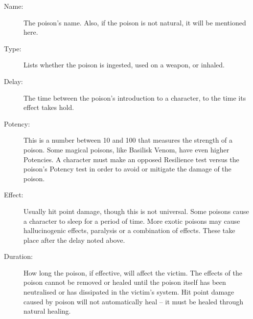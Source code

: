 \begin{description}
	\item[Name:] The poison’s name. Also, if the poison is not natural, it will be mentioned here. 
	\item[Type:] Lists whether the poison is ingested, used on a weapon, or inhaled. 
	\item[Delay:] The time between the poison’s introduction to a character, to the time its effect takes hold. 
	\item[Potency:] This is a number between 10 and 100 that measures the strength of a poison. Some magical poisons, like Basilisk Venom, have even higher Potencies. A character must make an opposed Resilience test versus the poison’s Potency test in order to avoid or mitigate the damage of the poison. 
	\item[Effect:] Usually hit point damage, though this is not universal. Some poisons cause a character to sleep for a period of time. More exotic poisons may cause hallucinogenic effects, paralysis or a combination of effects. These take place after the delay noted above. 
	\item[Duration:] How long the poison, if effective, will affect the victim. The effects of the poison cannot be removed or healed until the poison itself has been neutralised or has dissipated in the victim’s system. Hit point damage caused by poison will not automatically heal – it must be healed through natural healing. 
\end{description}
